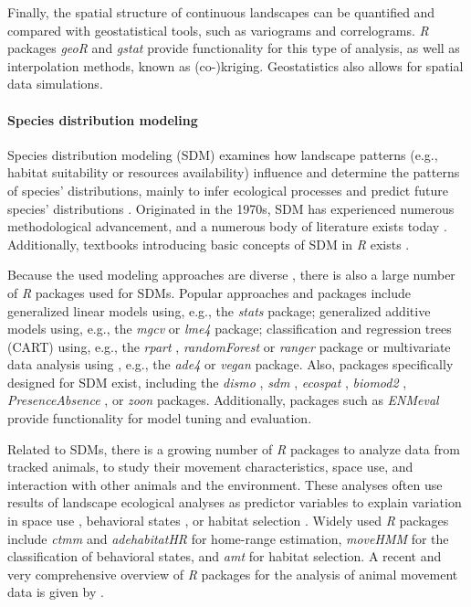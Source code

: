 \documentclass[smallextended]{svjour3}       %
\begin{document}
Finally, the spatial structure of continuous landscapes can be quantified and compared with geostatistical tools, such as variograms and correlograms.
\emph{R} packages \emph{geoR} \cite{Diggle2007} and \emph{gstat} \cite{Pebesma2004} provide functionality for this type of analysis, as well as interpolation methods, known as (co-)kriging.
Geostatistics also allows for spatial data simulations.

\hypertarget{sec:SDM}{%
\paragraph{Species distribution modeling}\label{sec:SDM}}

Species distribution modeling (SDM) examines how landscape patterns (e.g., habitat suitability or resources availability) influence and determine the patterns of species' distributions, mainly to infer ecological processes and predict future species' distributions \cite{Wiersma2011}.
Originated in the 1970s, SDM has experienced numerous methodological advancement, and a numerous body of literature exists today \cite{Zimmermann2010,Norberg2019}.
Additionally, textbooks introducing basic concepts of SDM in \emph{R} exists \cite{Guisan2017,Fletcher2018}.

Because the used modeling approaches are diverse \cite{Hooten2011,Kerr2011,Fletcher2018}, there is also a large number of \emph{R} packages used for SDMs.
Popular approaches and packages include generalized linear models using, e.g., the \emph{stats} \cite{RCoreTeam2019} package; generalized additive models using, e.g., the \emph{mgcv} \cite{Wood2017} or \emph{lme4} \cite{Bates2015} package; classification and regression trees (CART) using, e.g., the \emph{rpart} \cite{Therneau2019}, \emph{randomForest} \cite{Liaw2002} or \emph{ranger} \cite{Wright2017} package or multivariate data analysis using , e.g., the \emph{ade4} \cite{Dray2007} or \emph{vegan} \cite{Oksanen2019} package.
Also, packages specifically designed for SDM exist, including the \emph{dismo} \cite{Hijmans2017}, \emph{sdm} \cite{Naimi2016}, \emph{ecospat} \cite{Broennimann2020}, \emph{biomod2} \cite{Thuiller2020}, \emph{PresenceAbsence} \cite{Freeman2008}, or \emph{zoon} \cite{Golding2018} packages.
Additionally, packages such as \emph{ENMeval} \cite{Muscarella2014} provide functionality for model tuning and evaluation.

Related to SDMs, there is a growing number of \emph{R} packages to analyze data from tracked animals, to study their movement characteristics, space use, and interaction with other animals and the environment.
These analyses often use results of landscape ecological analyses as predictor variables to explain variation in space use \cite{Signer2015}, behavioral states \cite{Langrock2012}, or habitat selection \cite{Fieberg2020}.
Widely used \emph{R} packages include \emph{ctmm} \cite{Calabrese2016} and \emph{adehabitatHR} \cite{Calenge2006} for home-range estimation, \emph{moveHMM} \cite{Michelot2016} for the classification of behavioral states, and \emph{amt} \cite{Signer2019} for habitat selection.
A recent and very comprehensive overview of \emph{R} packages for the analysis of animal movement data is given by \cite{Joo2020}.
\end{document}
